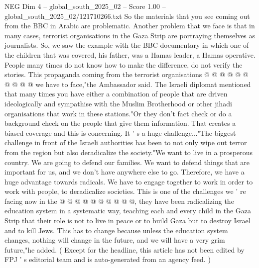 \begin{textsample}{NEG Dim 4 – global\_south\_2025\_02 – Score 1.00 – global\_south\_2025\_02/121710266.txt}
So the materials that you see coming out from the BBC in Arabic are problematic.
Another problem that we face is that in many cases, terrorist organisations in the Gaza Strip are portraying themselves as journalists.
So, we saw the example with the BBC documentary in which one of the children that was covered, his father, was a Hamas leader, a Hamas operative.
People many times do not know how to make the difference, do not verify the stories.
This propaganda coming from the terrorist organisations @ @ @ @ @ @ @ @ @ @ we have to face,"the Ambassador said.
The Israeli diplomat mentioned that many times you have either a combination of people that are driven ideologically and sympathise with the Muslim Brotherhood or other jihadi organisations that work in these stations."Or they don't fact check or do a background check on the people that give them information.
That creates a biased coverage and this is concerning.
It ' s a huge challenge..."The biggest challenge in front of the Israeli authorities has been to not only wipe out terror from the region but also deradicalize the society."We want to live in a prosperous country.
We are going to defend our families.
We want to defend things that are important for us, and we don't have anywhere else to go.
Therefore, we have a huge advantage towards radicals.
We have to engage together to work in order to work with people, to deradicalize societies.
This is one of the challenges we ' re facing now in the @ @ @ @ @ @ @ @ @ @, they have been radicalizing the education system in a systematic way, teaching each and every child in the Gaza Strip that their role is not to live in peace or to build Gaza but to destroy Israel and to kill Jews.
This has to change because unless the education system changes, nothing will change in the future, and we will have a very grim future,"he added. ( Except for the headline, this article has not been edited by FPJ ' s editorial team and is auto-generated from an agency feed. )

\end{textsample}
